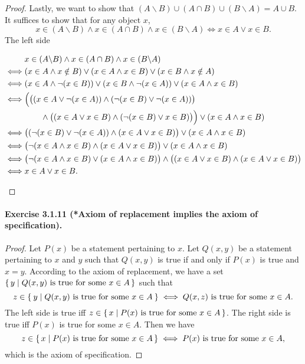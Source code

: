 \begin{proof}
    Lastly, we want to show that $(A\backslash B)\cup (A\cap B) \cup (B\backslash A) = A\cup B$. It suffices to show that for any object $x$, \[x\in (A\backslash B) \land x \in (A\cap B) \land x \in (B\backslash A) \iff x \in A \lor x\in B.\] The left side
    \begin{allowdisplaybreaks}
    \begin{align*}
        & x\in (A\backslash B) \land x \in (A\cap B) \land x \in (B\backslash A) 
        \\\iff& (x\in A \land x \notin B) \lor (x\in A \land x\in B) \lor (x\in B \land x\notin A)
        \\\iff& (x \in A \land \lnot (x \in B)) \lor (x \in B \land \lnot (x \in A)) \lor (x\in A \land x\in B)
        \\\iff& \Big( \big( (x \in A \lor \lnot (x \in A)) \land (\lnot (x \in B) \lor \lnot (x \in A)) \big) 
            \\&\qquad \land \big( (x \in A \lor x \in B) \land (\lnot (x \in B) \lor x \in B) \big) \Big) \lor (x\in A \land x\in B)
        \\\iff& \big((\lnot (x \in B) \lor \lnot (x \in A)) \land (x \in A \lor x \in B)\big) \lor (x\in A \land x\in B)
        \\\iff& \big( \lnot ( x \in A \land x \in B) \land (x \in A \lor x \in B)\big) \lor (x\in A \land x\in B)
        \\\iff& \big( \lnot (x \in A \land x \in B) \lor (x \in A \land x \in B) \big) \land \big( (x \in A \lor x \in B) \land (x \in A \lor x \in B) \big)
        \\\iff& x \in A \lor x \in B. \qedhere
    \end{align*}
    \end{allowdisplaybreaks}
\end{proof}

\paragraph{Exercise 3.1.11 (*Axiom of replacement implies the axiom of specification).}
\begin{proof}
    Let $P(x)$ be a statement pertaining to $x$. Let $Q(x,y)$ be a statement pertaining to $x$ and $y$ such that $Q(x,y)$ is true if and only if $P(x)$ is true and $x=y$. According to the axiom of replacement, we have a set $\set{y | Q(x,y)\text{ is true for some }x \in A}$ such that \[z \in \Set{y | Q(x,y)\text{ is true for some }x \in A} \iff Q(x,z)\text{ is true for some }x \in A.\] The left side is true iff $z\in \set{x | P(x)\text{ is true for some }x \in A}$. The right side is true iff $P(x)$ is true for some $x \in A$. Then we have \[z\in \set{x | P(x)\text{ is true for some }x \in A} \iff P(x)\text{ is true for some }x \in A,\] which is the axiom of specification.
\end{proof}

